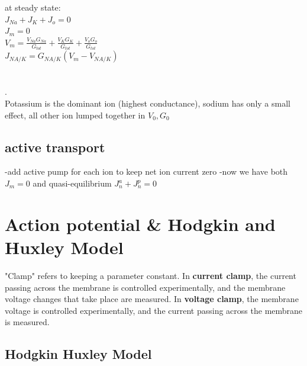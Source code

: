 \documentclass[9pt]{article}
\begin{document}
\begin{multicols}{2}
		at steady state:\\
		$J_{Na}{+}J_K{+}J_o=0$\\
		$J_m=0$\\
		$V_m{=}\frac{V_{Na}G_{Na}}{G_{tot}}{+}\frac{V_KG_K}{G_{tot}}{+}\frac{V_oG_o}{G_{tot}}$\\
		$J_{NA/K}=G_{NA/K}(V_m-V_{NA/K})$\\
		\\\\
		.\\
Potassium is the dominant ion (highest conductance), sodium has only a small effect, all other ion lumped together in $V_0,G_0$\\
		\subsection{active transport}
		-add active pump for each ion to keep net ion current zero
		-now we have both $J_m=0$ and quasi-equilibrium $J_n^a+J_n^p=0$ 
	
		
\section{Action potential \& Hodgkin and Huxley Model}
		"Clamp" refers to keeping a parameter constant. In \textbf{current clamp}, the current passing across the membrane is controlled experimentally, and the membrane voltage changes that take place are measured. In \textbf{voltage clamp}, the membrane voltage is controlled experimentally, and the current passing across the membrane is measured.
		\subsection{Hodgkin Huxley Model}


\end{multicols}
\end{document}
